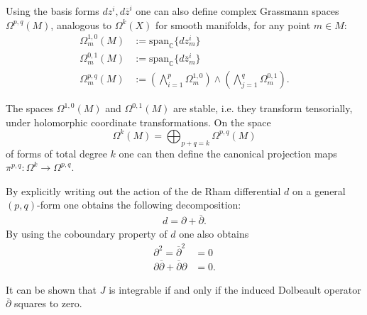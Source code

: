     Using the basis forms $dz^i,d\overline{z}^i$ one can also define complex Grassmann spaces $\Omega^{p,q}(M)$, analogous to $\Omega^k(X)$ for smooth manifolds, for any point $m\in M$:
    \begin{align}
        \Omega^{1,0}_m(M) &:= \text{span}_{\mathbb{C}}\{dz^i_m\}\\
        \Omega^{0,1}_m(M) &:= \text{span}_{\mathbb{C}}\{d\overline{z}^i_m\}\\
        \Omega^{p,q}_m(M) &:= \left(\bigwedge_{i=1}^p\Omega^{1, 0}_m\right)\wedge\left(\bigwedge_{j=1}^q\Omega^{0, 1}_m\right).
    \end{align}

    \begin{property}
        The spaces $\Omega^{1,0}(M)$ and $\Omega^{0,1}(M)$ are stable, i.e. they transform tensorially, under holomorphic coordinate transformations. On the space \[\Omega^k(M) = \bigoplus_{p+q=k}\Omega^{p,q}(M)\] of forms of total degree $k$ one can then define the canonical projection maps $\pi^{p,q}:\Omega^k\rightarrow\Omega^{p,q}$.
    \end{property}

    \begin{property}
        By explicitly writing out the action of the de Rham differential $d$ on a general $(p,q)$-form one obtains the following decomposition:
        \begin{gather}
            d = \partial + \overline{\partial}.
        \end{gather}
        By using the coboundary property of $d$ one also obtains
        \begin{align}
            \partial^2 = \overline{\partial}^2 &= 0\\
            \partial\overline{\partial} + \overline{\partial}\partial &= 0.
        \end{align}
    \end{property}
    \begin{remark}
        It can be shown that $J$ is integrable if and only if the induced Dolbeault operator $\overline{\partial}$ squares to zero.
    \end{remark}

